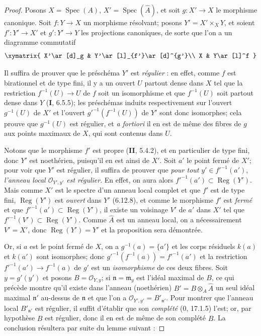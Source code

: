 \begin{proof}
Posons $X=\operatorname{Spec}(A)$, $X'=\operatorname{Spec}(\widehat A)$, et
soit $g:X'\to X$ le morphisme canonique. Soit $f:Y\to X$ un morphisme
résolvant; posons $Y'=X'\times_XY$, et soient $f':Y'\to X'$ et $g':Y'\to Y$
les projections canoniques, de sorte que l'on a un diagramme commutatif
\[
\xymatrix{
X'\ar[d]_g & Y'\ar[l]_{f'}\ar[d]^{g'}\\
X & Y\ar[l]^f
}
\]

Il suffira de prouver que le préschéma $Y'$ est \emph{régulier} : en effet,
comme $f$ est birationnel et de type fini, il y a un ouvert $U$ partout dense
dans $X$ tel que la restriction $f^{-1}(U)\to U$ de $f$ soit un isomorphisme
et que $f^{-1}(U)$ soit partout dense dans $Y$ (\textbf{I}, 6.5.5); les
préschémas induits respectivement sur l'ouvert $g^{-1}(U)$ de $X'$ et l'ouvert
$g'^{-1}(f^{-1}(U))$ de $Y'$ sont donc isomorphes; cela prouve que
$g^{-1}(U)$ est régulier, et \emph{a fortiori} il en est de même des fibres de
$g$ aux points maximaux de $X$, qui sont contenus dans $U$.


Notons que le morphisme $f'$ est propre (\textbf{II}, 5.4.2), et en
particulier de type fini, donc $Y'$ est noethérien, puisqu'il en est ainsi de
$X'$. Soit $a'$ le point fermé de $X'$; pour voir que $Y'$ est régulier, il
suffira de prouver que \emph{pour tout} $y'\in f'^{-1}(a')$, \emph{l'anneau
local $\mathcal O_{Y',y'}$ est régulier}. En effet, on aura alors
$f'^{-1}(a')\subset\operatorname{Reg}(Y')$. Mais comme $X'$ est le spectre
d'un anneau local complet et que $f'$ est de type fini,
$\operatorname{Reg}(Y')$ est \emph{ouvert} dans $Y'$ (6.12.8), et comme le
morphisme $f'$ est \emph{fermé} et que
$f'^{-1}(a')\subset\operatorname{Reg}(Y')$, il existe un voisinage $V'$ de
$a'$ dans $X'$ tel que $f'^{-1}(V')\subset\operatorname{Reg}(Y')$. Comme
$\widehat A$ est un anneau local, on a nécessairement $V'=X'$, donc
$\operatorname{Reg}(Y')=Y'$ et la proposition sera démontrée.

Or, si $a$ est le point fermé de $X$, on a $g^{-1}(a)=\{a'\}$ et les corps
résiduels $k(a)$ et $k(a')$ sont isomorphes; donc
$g'^{-1}(f^{-1}(a))=f'^{-1}(a')$ et la restriction
$f'^{-1}(a')\to f^{-1}(a)$ de $g'$ est un \emph{isomorphisme} de ces deux
fibres. Soit $y=g'(y')$ et posons $B=\mathcal O_{Y,y}$; si
$\mathfrak n=\mathfrak m_y$ est l'idéal maximal de $B$, ce qui précède montre
qu'il existe dans l'anneau (noethérien) $B'=B\otimes_A\widehat A$ un seul
idéal maximal $\mathfrak n'$ au-dessus de $\mathfrak n$ et que l'on a
$\mathcal O_{Y',y'}=B'_{\mathfrak n'}$. Pour montrer que l'anneau local
$B'_{\mathfrak n'}$ est régulier, il suffit d'établir que son \emph{complété}
(0, 17.1.5) l'est; or, par hypothèse $B$ est régulier, donc il en est de même
de son complété $\widehat B$. La conclusion résultera par suite du lemme
suivant :


\end{proof}

